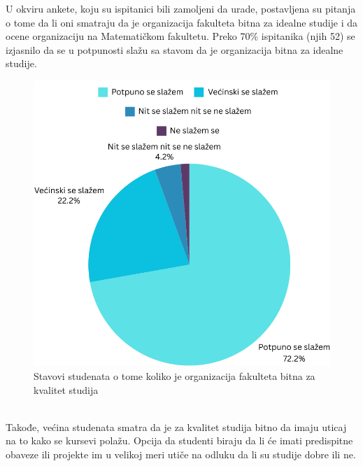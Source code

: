 \documentclass[a4paper]{article}
\begin{document}
{U okviru ankete, koju su ispitanici bili zamoljeni da urade, postavljena su pitanja o tome da li oni smatraju da je organizacija fakulteta bitna za idealne studije i da ocene
organizaciju na Matematičkom fakultetu. Preko 70\% ispitanika (njih 52) se izjasnilo da se u potpunosti slažu sa stavom da je organizacija bitna za idealne studije.\\
\begin{figure}[h!]
\begin{center}
    \includegraphics[scale = 0.3]{PieChartOrganizacija.png}
    \caption{Stavovi studenata o tome koliko je organizacija fakulteta bitna za kvalitet studija}
    \label{fig:organizacija}
\end{center}
\end{figure}
\\Takođe, većina studenata smatra da je za kvalitet studija bitno da imaju uticaj na to kako se kursevi polažu. Opcija da studenti biraju da li će imati predispitne obaveze ili projekte im u velikoj meri utiče na odluku da li su studije dobre ili ne.\\
\begin{figure}[h!]
\begin{center}

\end{center}
\end{figure}}
\end{document}
